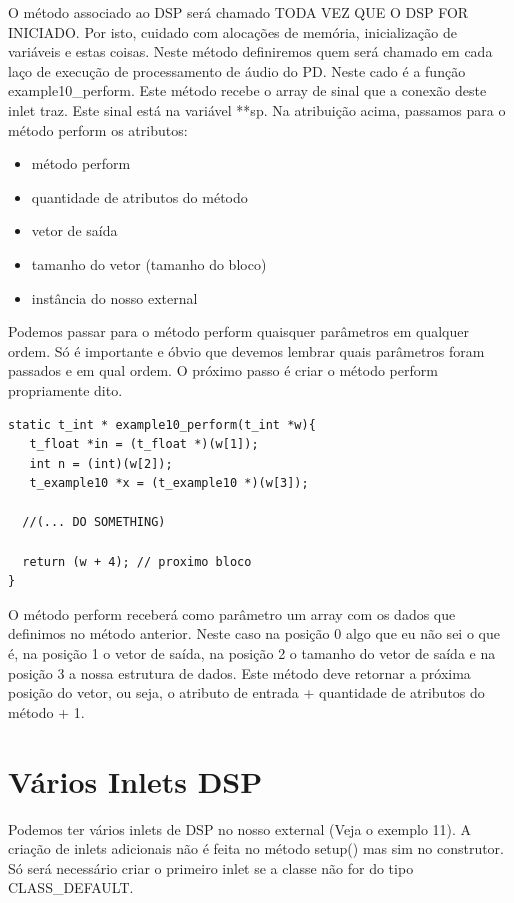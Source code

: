 \documentclass[10pt,a4paper]{report}
\begin{document}
O método associado ao DSP será chamado TODA VEZ QUE O DSP FOR INICIADO. Por isto, cuidado com alocações de memória, inicialização de variáveis e estas coisas. Neste método definiremos quem será chamado em cada laço de execução de processamento de áudio do PD. Neste cado é a função example10\_perform. Este método recebe o array de sinal que a conexão deste inlet traz. Este sinal está na variável **sp. Na atribuição acima, passamos para o método perform os atributos:

\begin{itemize}
\item método perform
\item quantidade de atributos do método
\item vetor de saída
\item tamanho do vetor (tamanho do bloco)
\item instância do nosso external
\end{itemize}

Podemos passar para o método perform quaisquer parâmetros em qualquer ordem. Só é importante e óbvio que devemos lembrar quais parâmetros foram passados e em qual ordem. O próximo passo é criar o método perform propriamente dito.

\begin{lstlisting}
static t_int * example10_perform(t_int *w){
   t_float *in = (t_float *)(w[1]);
   int n = (int)(w[2]);
   t_example10 *x = (t_example10 *)(w[3]);

  //(... DO SOMETHING)

  return (w + 4); // proximo bloco
}
\end{lstlisting}

O método perform receberá como parâmetro um array com os dados que definimos no método anterior. Neste caso na posição 0 algo que eu não sei o que é, na posição 1 o vetor de saída, na posição 2 o tamanho do vetor de saída e na posição 3 a nossa estrutura de dados. Este método deve retornar a próxima posição do vetor, ou seja, o atributo de entrada + quantidade de atributos do método + 1.

\section{Vários Inlets DSP}
Podemos ter vários inlets de DSP no nosso external (Veja o exemplo 11). A criação de inlets adicionais não é feita no método setup() mas sim no construtor. Só será necessário criar o primeiro inlet se a classe não for do tipo CLASS\_DEFAULT.
\end{document}
